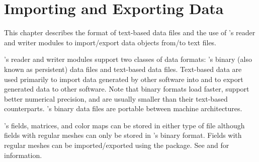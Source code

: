 %
% 
% 
% 
% 
% 
%


\chapter{Importing and Exporting \sr{} Data}
\label{ch:import_export} 

This chapter describes the format of text-based data files and the use
of \sr{}'s reader and writer modules to import/export \sr{} data
objects from/to text files. 

\sr{}'s reader and writer modules support two classes of data formats:
\sr{}'s binary (also known as persistent) data files and text-based
data files.  Text-based data are used primarily to import data
generated by other software into \sr{} and to export \sr{} generated
data to other software.  Note that binary formats load faster, support
better numerical precision, and are usually smaller than their
text-based counterparts.  \sr{}'s binary data files are portable
between machine architectures.

\sr{}'s fields, matrices, and color maps can be stored in either type
of file although fields with regular meshes can only be stored in
\sr{}'s binary format.  Fields with regular meshes can be
imported/exported using the  package.  See
 and
for information.

